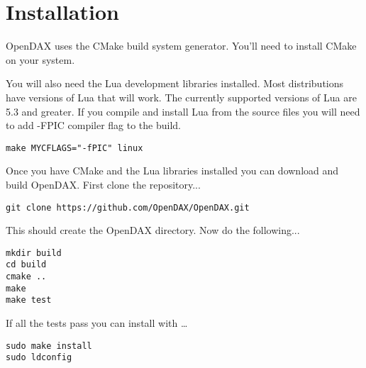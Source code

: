 \section{Installation}

OpenDAX uses the CMake build system generator.  You'll need to install CMake
on your system.

You will also need the Lua development libraries installed.  Most 
distributions have versions of Lua that will work.  The currently supported
versions of Lua are 5.3 and greater.
If you compile and install Lua from the source files you will need to add -FPIC 
compiler flag to the build.

\begin{verbatim}
make MYCFLAGS="-fPIC" linux
\end{verbatim}

Once you have CMake and the Lua libraries installed you can download and build
OpenDAX.  First clone the repository...

\begin{verbatim}
git clone https://github.com/OpenDAX/OpenDAX.git
\end{verbatim}

This should create the OpenDAX directory.  Now do the following...
\begin{verbatim}
mkdir build
cd build
cmake ..
make
make test
\end{verbatim}

If all the tests pass you can install with \ldots

\begin{verbatim}
sudo make install
sudo ldconfig
\end{verbatim}

